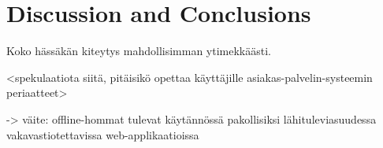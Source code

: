 
 \chapter{Discussion and Conclusions}
 Koko hässäkän kiteytys mahdollisimman ytimekkäästi.

 <spekulaatiota siitä, pitäisikö opettaa käyttäjille asiakas-palvelin-systeemin periaatteet>

 

-> väite: offline-hommat tulevat käytännössä pakollisiksi lähituleviasuudessa vakavastiotettavissa web-applikaatioissa


 



